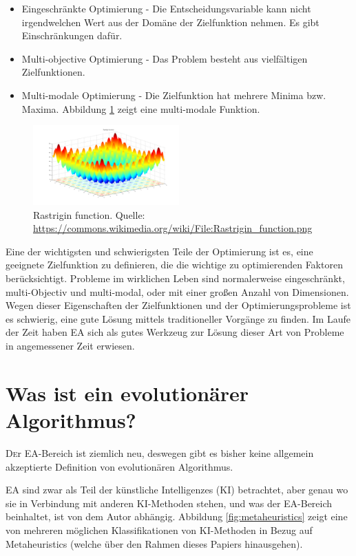 \documentclass[twoside,twocolumn]{article}
\begin{document}
\begin{itemize}
\item{Eingeschränkte Optimierung - Die Entscheidungsvariable kann nicht irgendwelchen Wert aus der Domäne der Zielfunktion nehmen. Es gibt Einschränkungen dafür.}
\item{Multi-objective Optimierung - Das Problem besteht aus vielfältigen Zielfunktionen.}
\item{Multi-modale Optimierung - Die Zielfunktion hat mehrere Minima bzw. Maxima. Abbildung \ref{fig:rastrigin} zeigt eine multi-modale Funktion.}
\end{itemize}

\begin{figure}
\caption{Rastrigin function. Quelle: \url{https://commons.wikimedia.org/wiki/File:Rastrigin_function.png}}
\label{fig:rastrigin}
\centering
\includegraphics[width=0.5\textwidth]{images/rastrigin_function.png}
\end{figure}

Eine der wichtigsten und schwierigsten Teile der Optimierung ist es, eine geeignete Zielfunktion zu definieren, die die wichtige zu optimierenden Faktoren berücksichtigt.
Probleme im wirklichen Leben sind normalerweise eingeschränkt, multi-Objectiv und multi-modal, oder mit einer großen Anzahl von Dimensionen. Wegen dieser Eigenschaften der Zielfunktionen und der Optimierungsprobleme ist es schwierig, eine gute Lösung mittels traditioneller Vorgänge zu finden. Im Laufe der Zeit haben EA sich als gutes Werkzeug zur Lösung dieser Art von Probleme in angemessener Zeit erwiesen.


\section{Was ist ein evolutionärer Algorithmus?}
\lettrine[nindent=0em,lines=3]{D} er EA-Bereich ist ziemlich neu, deswegen gibt es bisher keine allgemein akzeptierte Definition von evolutionären Algorithmus.\par
EA sind zwar als Teil der künstliche Intelligenzes (KI) betrachtet, aber genau wo sie in Verbindung mit anderen KI-Methoden stehen, und was der EA-Bereich beinhaltet, ist von dem Autor abhängig. Abbildung \ref{fig:metaheuristics} zeigt eine von mehreren möglichen Klassifikationen von KI-Methoden in Bezug auf Metaheuristics (welche über den Rahmen dieses Papiers hinausgehen).
\end{document}
